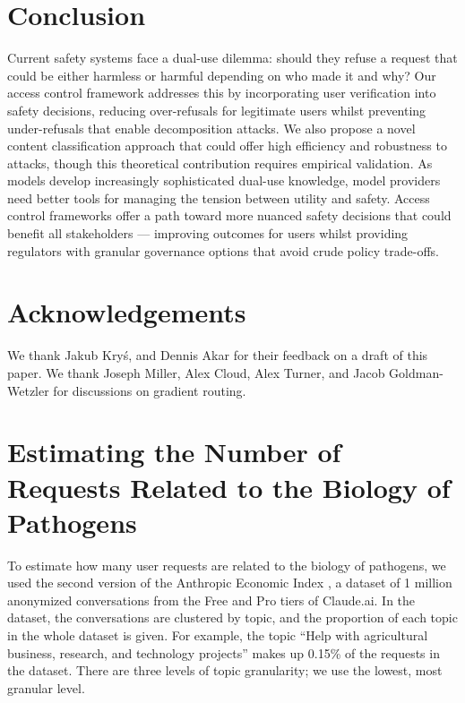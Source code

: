\documentclass{article}
\theoremstyle{plain}
\theoremstyle{definition}
\theoremstyle{remark}
\begin{document}
\section{Conclusion}

Current safety systems face a dual-use dilemma: should they refuse a request that could be either harmless or harmful depending on who made it and why?
Our access control framework addresses this by incorporating user verification into safety decisions, reducing over-refusals for legitimate users whilst preventing under-refusals that enable decomposition attacks.
We also propose a novel content classification approach that could offer high efficiency and robustness to attacks, though this theoretical contribution requires empirical validation.
As models develop increasingly sophisticated dual-use knowledge, model providers need better tools for managing the tension between utility and safety.
Access control frameworks offer a path toward more nuanced safety decisions that could benefit all stakeholders --- improving outcomes for users whilst providing regulators with granular governance options that avoid crude policy trade-offs.

\section*{Acknowledgements}

We thank Jakub Kryś, and Dennis Akar for their feedback on a draft of this paper. We thank Joseph Miller, Alex Cloud, Alex Turner, and Jacob Goldman-Wetzler for discussions on gradient routing.




\newpage
\appendix

\section{Estimating the Number of Requests Related to the Biology of Pathogens} \label{appendix:estimating-biology-requests}

To estimate how many user requests are related to the biology of pathogens, we used the second version of the Anthropic Economic Index \cite{handa2025economictasksperformedai}, a dataset of 1 million anonymized conversations from the Free and Pro tiers of Claude.ai.
In the dataset, the conversations are clustered by topic, and the proportion of each topic in the whole dataset is given.
For example, the topic ``Help with agricultural business, research, and technology projects'' makes up 0.15\% of the requests in the dataset.
There are three levels of topic granularity; we use the lowest, most granular level.
\end{document}
